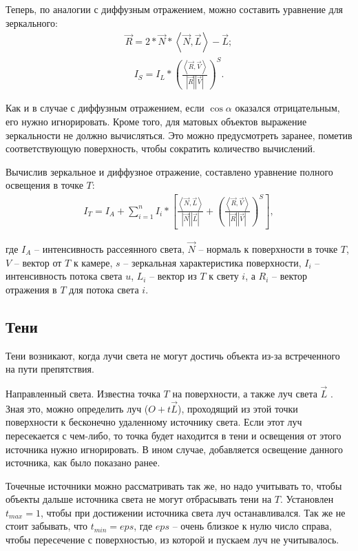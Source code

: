 Теперь, по аналогии с диффузным отражением, можно составить уравнение для зеркального:
\begin{gather}
	\vec{R} = 2*\vec{N}*\left\langle{\vec{N}, \vec{L}}\right\rangle - \vec{L};
\end{gather}
\begin{gather}
	I_{S} = I_{L}*\left( \frac{\left\langle{\vec{R}, \vec{V}}\right\rangle}{\left| {\vec{R}} \right| \left| {\vec{V}} \right|} \right)^{S}.
\end{gather}

Как и в случае с диффузным отражением, если $\cos{\alpha}$ оказался отрицательным, его нужно игнорировать. Кроме того, для матовых объектов выражение зеркальности не должно вычисляться. Это можно предусмотреть заранее, пометив соответствующую поверхность, чтобы сократить количество вычислений.

Вычислив зеркальное и диффузное отражение, составлено уравнение полного освещения в точке $T$:
\begin{gather}
	I_{T} = I_{A} + \sum_{i=1}^n I_{i}*\left[ {\frac{\left\langle{\vec{N}, \vec{L}}\right\rangle}{\left| {\vec{N}} \right| \left| {\vec{L}} \right|} + \left( \frac{\left\langle{\vec{R}, \vec{V}}\right\rangle}{\left| {\vec{R}} \right| \left| {\vec{V}} \right|} \right)^{S}} \right],
\end{gather}

где $I_{A}$ – интенсивность рассеянного света, $\vec{N}$ -- нормаль к поверхности в точке $T$, $V$ -- вектор от $T$ к камере, $s$ -- зеркальная характеристика поверхности, $I_{i}$ -- интенсивность потока света $u$, $L_{i}$ -- вектор из $T$ к свету $i$, а $R_{i}$ -- вектор отражения в $T$ для потока света $i$.

\subsection{Тени}

Тени возникают, когда лучи света не могут достичь объекта из-за встреченного на пути препятствия.

Направленный света. Известна точка $T$ на поверхности, а также луч света $\vec{L}$ . Зная это, можно определить луч ($O+t\vec{L}$), проходящий из этой точки поверхности к бесконечно удаленному источнику света. Если этот луч пересекается с чем-либо, то точка будет находится в тени и освещения от этого источника нужно игнорировать. В ином случае, добавляется освещение данного источника, как было показано ранее.

Точечные источники можно рассматривать так же, но надо учитывать то, чтобы объекты дальше источника света не могут отбрасывать тени на $T$. Установлен $t_{max} = 1$, чтобы при достижении источника света луч останавливался. Так же не стоит забывать, что $t_{min} = eps$, где $eps$ – очень близкое к нулю число справа, чтобы пересечение с поверхностью, из которой и пускаем луч не учитывалось.

